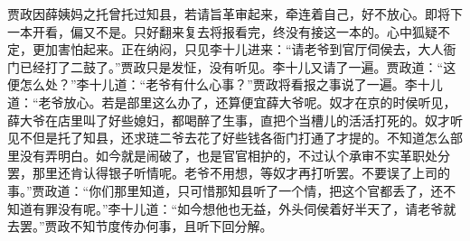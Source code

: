 \begin{parag}
    贾政因薛姨妈之托曾托过知县，若请旨革审起来，牵连着自己，好不放心。即将下一本开看，偏又不是。只好翻来复去将报看完，终没有接这一本的。心中狐疑不定，更加害怕起来。正在纳闷，只见李十儿进来：“请老爷到官厅伺侯去，大人衙门已经打了二鼓了。”贾政只是发怔，没有听见。李十儿又请了一遍。贾政道：“这便怎么处？”李十儿道：“老爷有什么心事？”贾政将看报之事说了一遍。李十儿道：“老爷放心。若是部里这么办了，还算便宜薛大爷呢。奴才在京的时侯听见，薛大爷在店里叫了好些媳妇，都喝醉了生事，直把个当槽儿的活活打死的。奴才听见不但是托了知县，还求琏二爷去花了好些钱各衙门打通了才提的。不知道怎么部里没有弄明白。如今就是闹破了，也是官官相护的，不过认个承审不实革职处分罢，那里还肯认得银子听情呢。老爷不用想，等奴才再打听罢。不要误了上司的事。”贾政道：“你们那里知道，只可惜那知县听了一个情，把这个官都丢了，还不知道有罪没有呢。”李十儿道：“如今想他也无益，外头伺侯着好半天了，请老爷就去罢。”贾政不知节度传办何事，且听下回分解。
\end{parag}